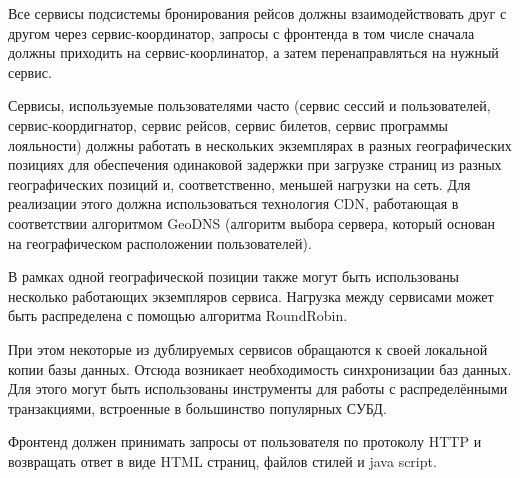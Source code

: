 Все сервисы подсистемы бронирования рейсов должны взаимодействовать друг с другом через сервис-координатор, запросы с фронтенда в том числе сначала должны приходить на сервис-коорлинатор, а затем перенаправляться на нужный сервис. 

Сервисы, используемые пользователями часто (сервис сессий и пользователей, сервис-коордигнатор, сервис рейсов, сервис билетов, сервис программы лояльности) должны работать в нескольких экземплярах в разных географических позициях для обеспечения одинаковой задержки при загрузке страниц из разных географических позиций и, соответственно, меньшей нагрузки на сеть. Для реализации этого должна использоваться технология CDN, работающая в соответствии алгоритмом GeoDNS (алгоритм выбора сервера, который основан на географическом расположении пользователей). 

В рамках одной географической позиции также могут быть использованы несколько работающих экземпляров сервиса. Нагрузка между сервисами может быть распределена с помощью алгоритма RoundRobin.

При этом некоторые из дублируемых сервисов обращаются к своей локальной копии базы данных. Отсюда возникает необходимость синхронизации баз данных. Для этого могут быть использованы инструменты для работы с распределёнными транзакциями, встроенные в большинство популярных СУБД.


Фронтенд должен принимать запросы от пользователя по протоколу HTTP и возвращать ответ в виде HTML страниц, файлов стилей и java script.

